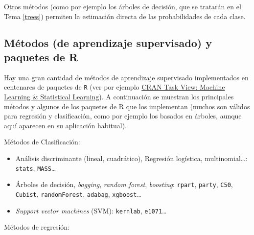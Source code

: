 \documentclass[
  spanish,
]{book}
\theoremstyle{break}
\theoremstyle{definition}
\theoremstyle{definition}
\theoremstyle{definition}
\theoremstyle{remark}
\begin{document}
Otros métodos (como por ejemplo los árboles de decisión, que se tratarán en el Tema \ref{trees}) permiten la estimación directa de las probabilidades de cada clase.

\hypertarget{metodos-pkgs}{%
\subsection{Métodos (de aprendizaje supervisado) y paquetes de R}\label{metodos-pkgs}}

Hay una gran cantidad de métodos de aprendizaje supervisado implementados en centenares de paquetes de \texttt{R} (ver por ejemplo \href{https://cran.r-project.org/web/views/MachineLearning.html}{CRAN Task View: Machine Learning \& Statistical Learning}).
A continuación se muestran los principales métodos y algunos de los paquetes de R que los implementan (muchos son válidos para regresión y clasificación, como por ejemplo los basados en árboles, aunque aquí aparecen en su aplicación habitual).

Métodos de Clasificación:

\begin{itemize}
\item
  Análisis discriminante (lineal, cuadrático), Regresión logística, multinomial\ldots:
  \texttt{stats}, \texttt{MASS}\ldots{}
\item
  Árboles de decisión, \emph{bagging}, \emph{random forest}, \emph{boosting}:
  \texttt{rpart}, \texttt{party}, \texttt{C50}, \texttt{Cubist}, \texttt{randomForest}, \texttt{adabag}, \texttt{xgboost}\ldots{}
\item
  \emph{Support vector machines} (SVM):
  \texttt{kernlab}, \texttt{e1071}\ldots{}
\end{itemize}

Métodos de regresión:
\end{document}
